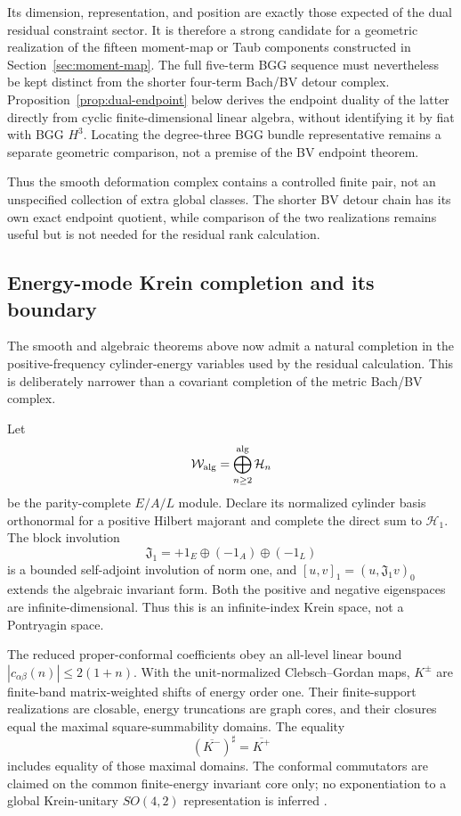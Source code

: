 \documentclass[11pt]{article}
\theoremstyle{definition}
\theoremstyle{remark}
\newcommand{\W}{\mathcal W}
\newcommand{\cH}{\mathcal H}
\begin{document}
Its dimension, representation, and position are exactly those expected of
the dual residual constraint sector.  It is therefore a strong candidate
for a geometric realization of the fifteen moment-map or Taub components
constructed in Section~\ref{sec:moment-map}.  The full five-term BGG sequence
must nevertheless be kept distinct from the shorter four-term Bach/BV
detour complex.  Proposition~\ref{prop:dual-endpoint} below derives the
endpoint duality of the latter directly from cyclic finite-dimensional
linear algebra, without identifying it by fiat with BGG $H^3$.  Locating the
degree-three BGG bundle representative remains a separate geometric
comparison, not a premise of the BV endpoint theorem.

Thus the smooth deformation complex contains a controlled finite pair,
not an unspecified collection of extra global classes.  The shorter BV
detour chain has its own exact endpoint quotient, while comparison of the
two realizations remains useful but is not needed for the residual rank
calculation.

\subsection{Energy-mode Krein completion and its boundary}
\label{sec:energy-mode-completion}

The smooth and algebraic theorems above now admit a natural completion in
the positive-frequency cylinder-energy variables used by the residual
calculation.  This is deliberately narrower than a covariant completion of
the metric Bach/BV complex.

Let
\begin{equation}
 \W_{\rm alg}=\bigoplus_{n\ge2}^{\rm alg}\cH_n
\end{equation}
be the parity-complete $E/A/L$ module.  Declare its normalized cylinder
basis orthonormal for a positive Hilbert majorant and complete the direct
sum to $\mathscr H_1$.  The block involution
\begin{equation}
 \mathfrak J_1=+1_E\oplus(-1_A)\oplus(-1_L)
\end{equation}
is a bounded self-adjoint involution of norm one, and
$[u,v]_1=(u,\mathfrak J_1v)_0$ extends the algebraic invariant form.  Both
the positive and negative eigenspaces are infinite-dimensional.  Thus this
is an infinite-index Krein space, not a Pontryagin space.

The reduced proper-conformal coefficients obey an all-level linear bound
$|c_{\alpha\beta}(n)|\le 2(1+n)$.  With the unit-normalized Clebsch--Gordan
maps, $K^\pm$ are finite-band matrix-weighted shifts of energy order one.
Their finite-support realizations are closable, energy truncations are graph
cores, and their closures equal the maximal square-summability domains.
The equality
\begin{equation}
 (\overline{K^-})^\sharp=\overline{K^+}
\end{equation}
includes equality of those maximal domains.  The conformal commutators are
claimed on the common finite-energy invariant core only; no exponentiation
to a global Krein-unitary $SO(4,2)$ representation is inferred
\cite{JorgensenTian}.
\end{document}

